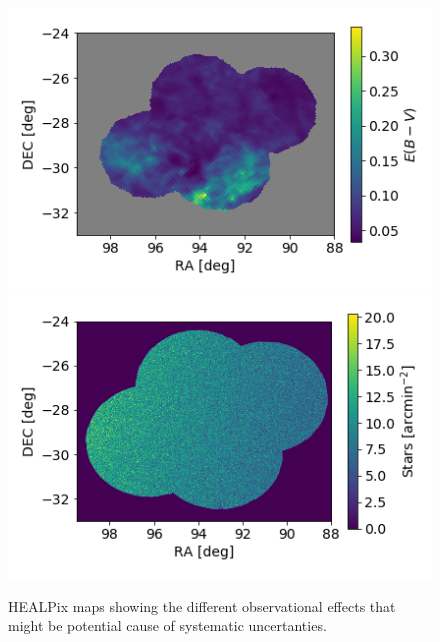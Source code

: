\documentclass[twocolumn]{aastex62}
\begin{document}
\begin{figure}
\centering
\includegraphics[width=0.7\columnwidth]{extinction.png}
\includegraphics[width=0.7\columnwidth]{stellar_density.png}
\caption{HEALPix maps showing the different observational effects that might be potential cause of systematic uncertanties.}
\label{fig:systematic_maps2}
\end{figure}
\end{document}
